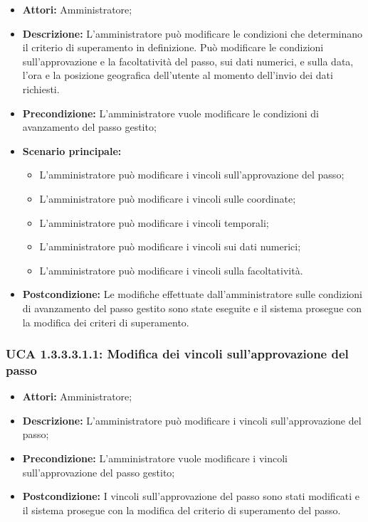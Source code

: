 \begin{itemize}
\item \textbf{Attori:}
Amministratore;
\item \textbf{Descrizione:}
L'amministratore può modificare le condizioni che determinano il criterio di superamento in definizione.
Può modificare le condizioni sull'approvazione e la facoltatività del passo, sui dati numerici, e sulla data, l'ora e la posizione geografica dell'utente al momento dell'invio dei dati richiesti.
\item \textbf{Precondizione:}
L'amministratore vuole modificare le condizioni di avanzamento del passo gestito;
\item \textbf{Scenario principale:}
\begin{itemize}
\item L'amministratore può modificare i vincoli sull'approvazione del passo;
\item L'amministratore può modificare i vincoli sulle coordinate;
\item L'amministratore può modificare i vincoli temporali;
\item L'amministratore può modificare i vincoli sui dati numerici;
\item L'amministratore può modificare i vincoli sulla facoltatività.
\end{itemize}
\item \textbf{Postcondizione:}
Le modifiche effettuate dall'amministratore sulle condizioni di avanzamento del passo gestito sono state eseguite e il sistema prosegue con la modifica dei criteri di superamento.
\end{itemize}

\hypertarget{A1.3.3.3.1.1}{}
\subsubsection{UCA 1.3.3.3.1.1: Modifica dei vincoli sull'approvazione del passo}
\begin{itemize}
\item \textbf{Attori:}
Amministratore;
\item \textbf{Descrizione:}
L'amministratore può modificare i vincoli sull'approvazione del passo;
\item \textbf{Precondizione:}
L'amministratore vuole modificare i vincoli sull'approvazione del passo gestito;
\item \textbf{Postcondizione:}
I vincoli sull'approvazione del passo sono stati modificati e il sistema prosegue con la modifica del criterio di superamento del passo.
\end{itemize}

